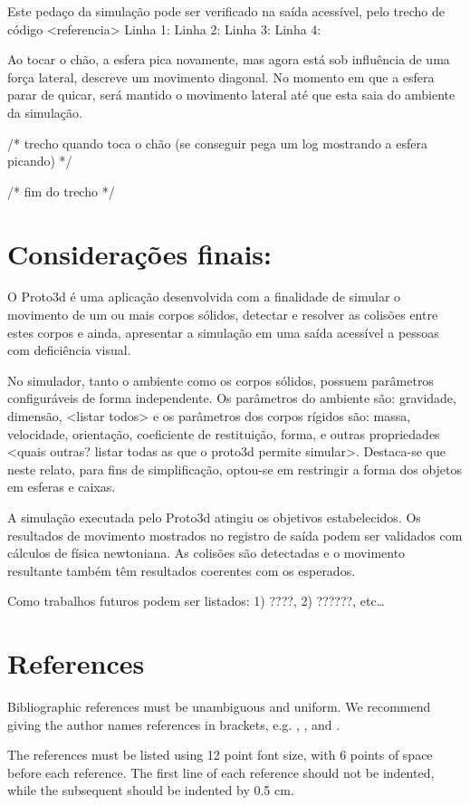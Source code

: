 \documentclass[12pt]{article}
\begin{document}
Este pedaço da simulação pode ser verificado na saída acessível, pelo trecho de código <referencia> 
Linha 1:  
Linha 2: 
Linha 3: 
Linha 4: 

Ao tocar o chão, a esfera pica novamente, mas agora está sob influência de uma força lateral, descreve um movimento diagonal. No momento em que a esfera parar de quicar, será mantido o movimento lateral até que esta saia do ambiente da simulação.

/* trecho quando toca o chão (se conseguir pega um log mostrando a esfera picando) */

/* fim do trecho */

\section{ Considerações finais:}
O Proto3d é uma aplicação desenvolvida com a finalidade de simular o movimento de um ou mais corpos sólidos, detectar e resolver as colisões entre estes corpos e ainda, apresentar a simulação em uma saída acessível a pessoas com deficiência visual.

No simulador, tanto o ambiente como os corpos sólidos, possuem parâmetros configuráveis de forma independente. Os parâmetros do ambiente são:  gravidade, dimensão, <listar todos>  e os parâmetros dos corpos rígidos são: massa, velocidade, orientação, coeficiente de restituição, forma, e outras propriedades <quais outras? listar todas as que o proto3d permite simular>. Destaca-se que neste relato, para fins de simplificação, optou-se em restringir a forma dos objetos em esferas e caixas.

A simulação executada pelo Proto3d atingiu os objetivos estabelecidos. Os resultados de movimento mostrados no registro de saída podem ser validados com cálculos de física newtoniana. As colisões são detectadas e o movimento resultante também têm resultados coerentes com os esperados. 

Como trabalhos futuros podem ser listados: 1) ????, 2) ??????, etc…



\section{References}

Bibliographic references must be unambiguous and uniform.  We recommend giving
the author names references in brackets, e.g. \cite{knuth:84},
\cite{boulic:91}, and \cite{smith:99}.

The references must be listed using 12 point font size, with 6 points of space
before each reference. The first line of each reference should not be
indented, while the subsequent should be indented by 0.5 cm.



\end{document}
